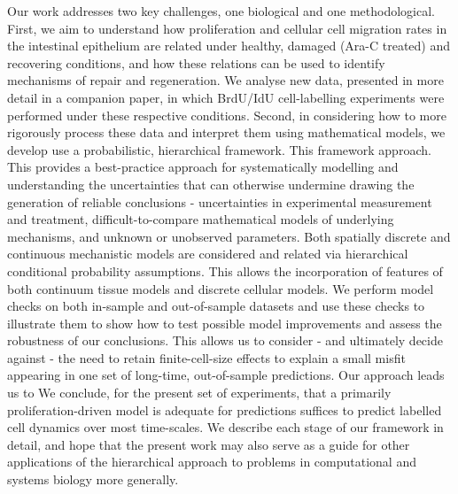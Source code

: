 \documentclass[10pt,letterpaper]{article}
\providecommand{\DIFaddtex}[1]{{\protect\color{blue} \sf #1}} %
\providecommand{\DIFdeltex}[1]{{\protect\color{red} \scriptsize #1}} %
\providecommand{\DIFaddbegin}{} %
\providecommand{\DIFaddend}{} %
\providecommand{\DIFdelbegin}{} %
\providecommand{\DIFdelend}{} %
\providecommand{\DIFadd}[1]{\texorpdfstring{\DIFaddtex{#1}}{#1}} %
\providecommand{\DIFdel}[1]{\texorpdfstring{\DIFdeltex{#1}}{}} %
\begin{document}
Our work addresses two key challenges, one biological and one
methodological. First, we aim to understand how proliferation and \DIFdelbegin \DIFdel{cellular }\DIFdelend \DIFaddbegin \DIFadd{cell
}\DIFaddend migration rates in the intestinal epithelium are related under healthy,
damaged (Ara-C treated) and recovering conditions, and how these
relations can be used to identify mechanisms of repair and regeneration.
We analyse new data, presented in more detail in a companion paper, in
which BrdU/IdU cell-labelling experiments were performed under these
respective conditions. Second, in considering how to more rigorously
process these data and interpret them using mathematical models, we \DIFdelbegin \DIFdel{develop }\DIFdelend \DIFaddbegin \DIFadd{use
}\DIFaddend a probabilistic, hierarchical \DIFdelbegin \DIFdel{framework. This framework }\DIFdelend \DIFaddbegin \DIFadd{approach. This }\DIFaddend provides a best-practice
approach for systematically modelling and understanding the
uncertainties that can otherwise undermine \DIFdelbegin \DIFdel{drawing }\DIFdelend \DIFaddbegin \DIFadd{the generation of }\DIFaddend reliable
conclusions - uncertainties in experimental measurement and treatment,
difficult-to-compare mathematical models of underlying mechanisms, and
unknown or unobserved parameters. Both \DIFaddbegin \DIFadd{spatially }\DIFaddend discrete and continuous
mechanistic models are considered and related via hierarchical
conditional probability assumptions. \DIFdelbegin \DIFdel{This allows the
incorporation of features of both continuum tissue models and discrete
cellular models. }\DIFdelend We perform model checks on both
in-sample and out-of-sample datasets and use \DIFdelbegin \DIFdel{these checks to illustrate }\DIFdelend \DIFaddbegin \DIFadd{them to show }\DIFaddend how to test
possible model improvements and assess the robustness of our
conclusions. \DIFdelbegin \DIFdel{This allows us to consider - and ultimately decide against
- the need to retain finite-cell-size effects to explain a small misfit
appearing in one set of long-time, out-of-sample predictions. Our
approach leads us to }\DIFdelend \DIFaddbegin \DIFadd{We }\DIFaddend conclude, for the present set of experiments, that a
primarily proliferation-driven model \DIFdelbegin \DIFdel{is adequate for predictions }\DIFdelend \DIFaddbegin \DIFadd{suffices to predict labelled cell
dynamics }\DIFaddend over most time-scales.
\DIFdelbegin \DIFdel{We describe each stage of our framework in detail, and
hope that the present work may also serve as a guide for other
applications of the hierarchical approach to problems in computational
and systems biology more generally.
}\DIFdelend 
\end{document}
